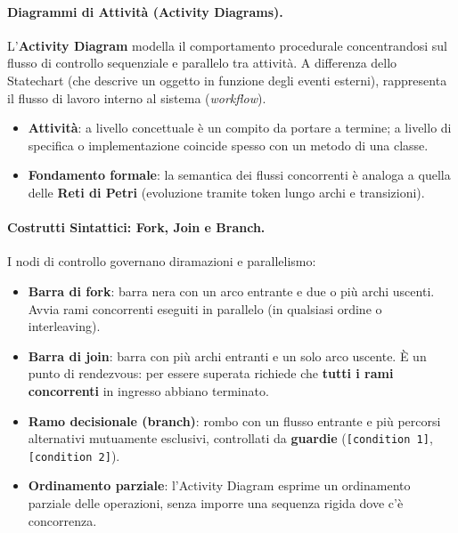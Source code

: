\documentclass[12pt]{extarticle}
\begin{document}
\paragraph{Diagrammi di Attività (Activity Diagrams).}
L'\textbf{Activity Diagram} modella il comportamento procedurale concentrandosi sul flusso di controllo sequenziale e parallelo tra attività. A differenza dello Statechart (che descrive un oggetto in funzione degli eventi esterni), rappresenta il flusso di lavoro interno al sistema (\textit{workflow}).
\begin{itemize}
    \item \textbf{Attività}: a livello concettuale è un compito da portare a termine; a livello di specifica o implementazione coincide spesso con un metodo di una classe.
    \item \textbf{Fondamento formale}: la semantica dei flussi concorrenti è analoga a quella delle \textbf{Reti di Petri} (evoluzione tramite token lungo archi e transizioni).
\end{itemize}

\paragraph{Costrutti Sintattici: Fork, Join e Branch.}
I nodi di controllo governano diramazioni e parallelismo:
\begin{itemize}
    \item \textbf{Barra di fork}: barra nera con un arco entrante e due o più archi uscenti. Avvia rami concorrenti eseguiti in parallelo (in qualsiasi ordine o interleaving).
    \item \textbf{Barra di join}: barra con più archi entranti e un solo arco uscente. È un punto di rendezvous: per essere superata richiede che \textbf{tutti i rami concorrenti} in ingresso abbiano terminato.
    \item \textbf{Ramo decisionale (branch)}: rombo con un flusso entrante e più percorsi alternativi mutuamente esclusivi, controllati da \textbf{guardie} (\texttt{[condition 1]}, \texttt{[condition 2]}).
    \item \textbf{Ordinamento parziale}: l'Activity Diagram esprime un ordinamento parziale delle operazioni, senza imporre una sequenza rigida dove c'è concorrenza.
\end{itemize}
\end{document}
